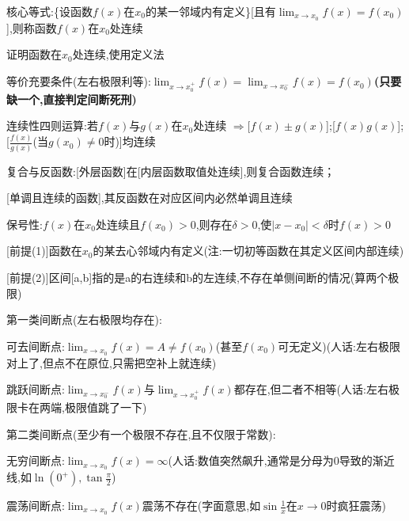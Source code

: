 \documentclass[11pt,a4paper,UTF8]{ctexart}
\begin{document}
\begin{thmbox}[{1.连续的定义与性质}]

核心等式:\{设函数$f(x)$在$x_0$的某一邻域内有定义\}[且有$\lim_{x \to x_0} f(x) = f(x_0)$],则称函数$f(x)$在$x_0$处连续

  证明函数在$x_0$处连续,使用定义法

等价充要条件(左右极限利等):$\lim_{x \to x_0^+} f(x) = \lim_{x \to x_0^-} f(x) = f(x_0)$\textbf{(只要缺一个,直接判定间断死刑)}

\end{thmbox}
\begin{thmbox}[{2.连续性运算法则}]

  连续性四则运算:若$f(x)$与$g(x)$在$x_0$处连续 $\Rightarrow [f(x) \pm g(x)$];[$f(x)g(x)$];[$\frac{f(x)}{g(x)}$(当$g(x_0) \neq 0$时)]均连续

  复合与反函数:[外层函数]在[内层函数取值处连续],则复合函数连续；

  	    [单调且连续的函数],其反函数在对应区间内必然单调且连续

  保号性:$f(x)$在$x_0$处连续且$f(x_0)>0$,则存在$\delta>0$,使$|x-x_0|<\delta$时$f(x)>0$

\end{thmbox}
\begin{thmbox}[{3.间断点的定义与分类}]

[前提(1)]函数在$x_0$的某去心邻域内有定义(注:一切初等函数在其定义区间内部连续)

[前提(2)]区间[a,b]指的是a的右连续和b的左连续,不存在单侧间断的情况(算两个极限)

第一类间断点(左右极限均存在):

  可去间断点:$\lim_{x \to x_0} f(x) = A \neq f(x_0)$(甚至$f(x_0)$可无定义)(人话:左右极限对上了,但点不在原位,只需把空补上就连续)

  跳跃间断点:$\lim_{x \to x_0^-} f(x)$与$\lim_{x \to x_0^+} f(x)$都存在,但二者不相等(人话:左右极限卡在两端,极限值跳了一下)

第二类间断点(至少有一个极限不存在,且不仅限于常数):

  无穷间断点:$\lim_{x \to x_0} f(x) = \infty$(人话:数值突然飙升,通常是分母为$0$导致的渐近线,如$\ln(0^+), \tan \frac{\pi}{2}$)

  震荡间断点:$\lim_{x \to x_0} f(x)$震荡不存在(字面意思,如$\sin \frac{1}{x}$在$x \to 0$时疯狂震荡)

\end{thmbox}
\end{document}
